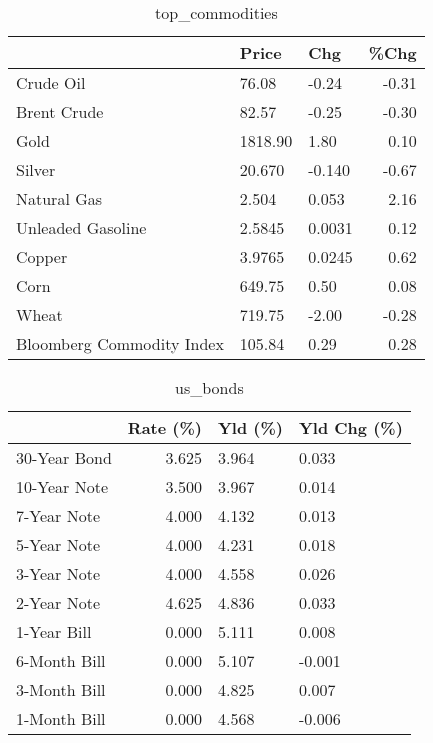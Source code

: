 \documentclass{article}%
\begin{document}
\begin{table}[htbp]%
\caption{top\_commodities}%
\centering%
\begin{adjustbox}{width=1\textwidth}%
\begin{tabular}{lllr}
\toprule
                          &   Price &    Chg &  \%Chg \\
\midrule
               Crude Oil  &   76.08 &  -0.24 & -0.31 \\
             Brent Crude  &   82.57 &  -0.25 & -0.30 \\
                    Gold  & 1818.90 &   1.80 &  0.10 \\
                  Silver  &  20.670 & -0.140 & -0.67 \\
             Natural Gas  &   2.504 &  0.053 &  2.16 \\
       Unleaded Gasoline  &  2.5845 & 0.0031 &  0.12 \\
                  Copper  &  3.9765 & 0.0245 &  0.62 \\
                    Corn  &  649.75 &   0.50 &  0.08 \\
                   Wheat  &  719.75 &  -2.00 & -0.28 \\
Bloomberg Commodity Index &  105.84 &   0.29 &  0.28 \\
\bottomrule
\end{tabular}
%
\end{adjustbox}%
\end{table}

%


\begin{table}[htbp]%
\caption{us\_bonds}%
\centering%
\begin{adjustbox}{width=1\textwidth}%
\begin{tabular}{lrll}
\toprule
             &  Rate (\%) & Yld (\%) & Yld Chg (\%) \\
\midrule
30-Year Bond &     3.625 &   3.964 &       0.033 \\
10-Year Note &     3.500 &   3.967 &       0.014 \\
 7-Year Note &     4.000 &   4.132 &       0.013 \\
 5-Year Note &     4.000 &   4.231 &       0.018 \\
 3-Year Note &     4.000 &   4.558 &       0.026 \\
 2-Year Note &     4.625 &   4.836 &       0.033 \\
 1-Year Bill &     0.000 &   5.111 &       0.008 \\
6-Month Bill &     0.000 &   5.107 &      -0.001 \\
3-Month Bill &     0.000 &   4.825 &       0.007 \\
1-Month Bill &     0.000 &   4.568 &      -0.006 \\
\bottomrule
\end{tabular}
%
\end{adjustbox}%
\end{table}
\end{document}
